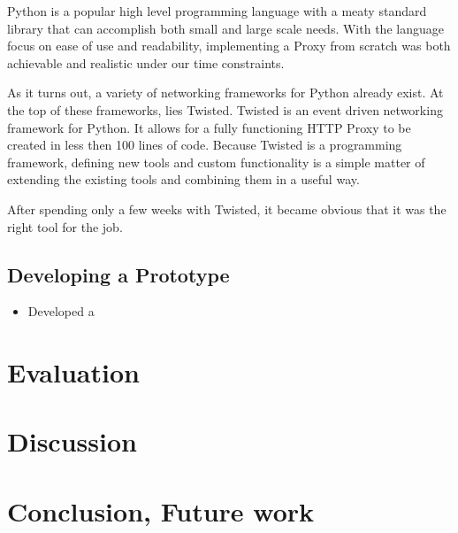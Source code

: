 \documentclass[12pt]{article}
\begin{document}
			Python is a popular high level programming language with a meaty standard library that can accomplish both small and large scale needs. With the language focus on ease of use and readability, implementing a Proxy from scratch was both achievable and realistic under our time constraints. 

			As it turns out, a variety of networking frameworks for Python already exist. At the top of these frameworks, lies Twisted. Twisted is an event driven networking framework for Python. It allows for a fully functioning HTTP Proxy to be created in less then 100 lines of code. Because Twisted is a programming framework, defining new tools and custom functionality is a simple matter of extending the existing tools and combining them in a useful way. 

			After spending only a few weeks with Twisted, it became obvious that it was the right tool for the job. 

	\subsection{Developing a Prototype}

		\begin{itemize}
			\item Developed a 
		\end{itemize}



		


\section{Evaluation}


\section{Discussion}


\section{Conclusion, Future work}


\listoftodos
\end{document}

